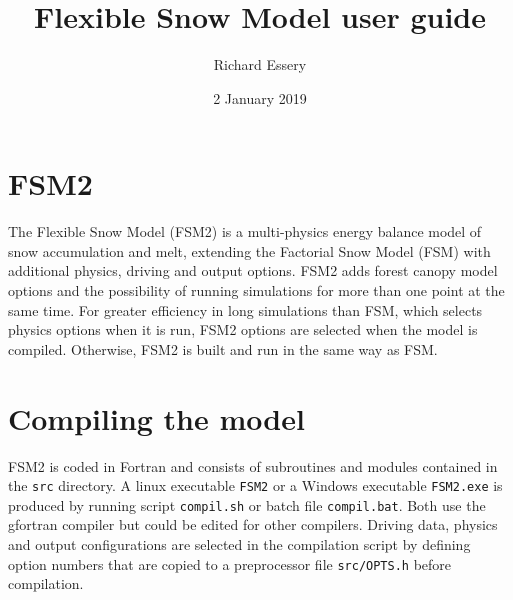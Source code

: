 \documentclass{article}
\title{Flexible Snow Model user guide}
\author{Richard Essery}
\date{2 January 2019}
\begin{document}
\maketitle
\parindent0pt

\section{FSM2}

The Flexible Snow Model (FSM2) is a multi-physics energy balance model of snow accumulation and melt, extending the Factorial Snow Model (FSM) with additional physics, driving and output options. FSM2 adds forest canopy model options and the possibility of running simulations for more than one point at the same time. For greater efficiency in long simulations than FSM, which selects physics options when it is run, FSM2 options are selected when the model is compiled. Otherwise, FSM2 is built and run in the same way as FSM.

\section{Compiling the model}

FSM2 is coded in Fortran and consists of subroutines and modules contained in the {\tt src} directory. A linux executable {\tt FSM2} or a Windows executable {\tt FSM2.exe} is produced by running script {\tt compil.sh} or batch file {\tt compil.bat}. Both use the gfortran compiler but could be edited for other compilers. Driving data, physics and output configurations are selected in the compilation script by defining option numbers that are copied to a preprocessor file {\tt src/OPTS.h} before compilation.
\end{document}
